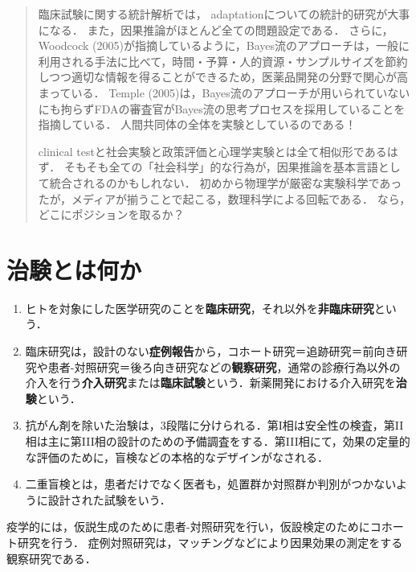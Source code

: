 \documentclass[uplatex,dvipdfmx]{jsreport}
\begin{document}
\begin{quotation}
    臨床試験に関する統計解析では，
    adaptationについての統計的研究が大事になる．
    また，因果推論がほとんど全ての問題設定である．
    さらに，Woodcock (2005)が指摘しているように，Bayes流のアプローチは，一般に利用される手法に比べて，時間・予算・人的資源・サンプルサイズを節約しつつ適切な情報を得ることができるため，医薬品開発の分野で関心が高まっている．
    Temple (2005)は，Bayes流のアプローチが用いられていないにも拘らずFDAの審査官がBayes流の思考プロセスを採用していることを指摘している．
    人間共同体の全体を実験としているのである！

    clinical testと社会実験と政策評価と心理学実験とは全て相似形であるはず．
    そもそも全ての「社会科学」的な行為が，因果推論を基本言語として統合されるのかもしれない．
    初めから物理学が厳密な実験科学であったが，メディアが揃うことで起こる，数理科学による回転である．
    なら，どこにポジションを取るか？
\end{quotation}

\section{治験とは何か}

\begin{definition}\mbox{}
    \begin{enumerate}
        \item ヒトを対象にした医学研究のことを\textbf{臨床研究}，それ以外を\textbf{非臨床研究}という．
        \item 臨床研究は，設計のない\textbf{症例報告}から，コホート研究＝追跡研究＝前向き研究や患者-対照研究＝後ろ向き研究などの\textbf{観察研究}，通常の診療行為以外の介入を行う\textbf{介入研究}または\textbf{臨床試験}という．新薬開発における介入研究を\textbf{治験}という．
        \item 抗がん剤を除いた治験は，3段階に分けられる．第I相は安全性の検査，第II相は主に第III相の設計のための予備調査をする．第III相にて，効果の定量的な評価のために，盲検などの本格的なデザインがなされる．
        \item 二重盲検とは，患者だけでなく医者も，処置群か対照群か判別がつかないように設計された試験をいう．
    \end{enumerate}
\end{definition}
\begin{remark}
    疫学的には，仮説生成のために患者-対照研究を行い，仮設検定のためにコホート研究を行う．
    症例対照研究は，マッチングなどにより因果効果の測定をする観察研究である．
\end{remark}
\end{document}
